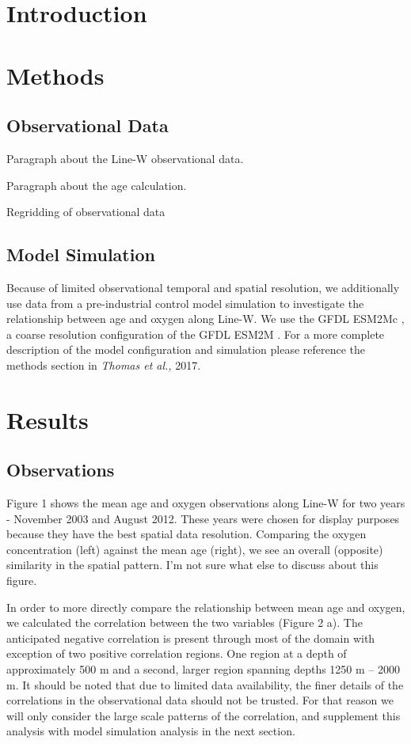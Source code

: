 \documentclass[11pt]{article} %
\begin{document}

\section{Introduction}


\section{Methods}
\subsection{Observational Data}
Paragraph about the Line-W observational data.

Paragraph about the age calculation.

Regridding of observational data

\subsection{Model Simulation}
Because of limited observational temporal and spatial resolution, we additionally
use data from a pre-industrial control model simulation to investigate the
relationship between age and oxygen along Line-W.  We use the GFDL ESM2Mc
\citep{Galbraith2011}, a coarse resolution configuration of the GFDL ESM2M
\citep{Dunne2012}. For a more complete description of the model configuration and
simulation please reference the methods section in \textit{Thomas et al.,} 2017.

\section{Results}
\subsection{Observations}

Figure 1 shows the mean age and oxygen observations along Line-W for two years -
November 2003 and August 2012. These years were chosen for display purposes because
they have the best spatial data resolution. Comparing the oxygen concentration (left)
against the mean age (right), we see an overall (opposite) similarity in the
spatial pattern. I'm not sure what else to discuss about this figure.

In order to more directly compare the relationship between mean age and oxygen,
we calculated the correlation between the two variables (Figure 2 a). The
anticipated negative correlation is present through most of the domain with exception
of two positive correlation regions. One region at a depth of approximately 500 m
and a second, larger region spanning depths 1250 m -- 2000 m. It should be noted that
due to limited data availability, the finer details of the correlations in the
observational data should not be trusted. For that reason we will only consider
the large scale patterns of the correlation, and supplement this analysis with
model simulation analysis in the next section.
\end{document}
